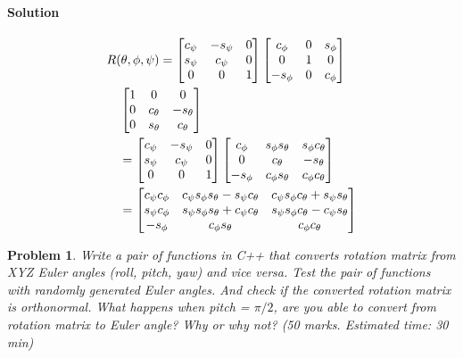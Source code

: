 \documentclass[twocolumn]{article}
\newtheorem{prob}{Problem}
\begin{document}
\paragraph*{Solution}
\begin{align}
&R(\theta, \phi, \psi) = \begin{bmatrix}
  c_\psi & - s_\psi & 0 \\
  s_\psi & c_\psi & 0 \\
  0 & 0 & 1
  \end{bmatrix}
  \begin{bmatrix}
    c_\phi & 0 & s_\phi \\
    0 & 1 & 0 \\
    - s_\phi & 0 & c_\phi
    \end{bmatrix}
 \notag\\&\quad
    \begin{bmatrix}
      1 & 0 & 0 \\
      0 & c_\theta & - s_\theta \\
      0 & s_\theta & c_\theta
      \end{bmatrix}
\notag\\&\quad
  =\begin{bmatrix}
    c_\psi & - s_\psi & 0 \\
    s_\psi & c_\psi & 0 \\
    0 & 0 & 1
  \end{bmatrix}
            \begin{bmatrix}
              c_\phi & s_\phi s_\theta & s_\phi c_\theta \\
              0 & c_\theta & -s_\theta \\
              -s_\phi & c_\phi s_\theta & c_\phi c_\theta
            \end{bmatrix}
\notag\\&\quad
  = \begin{bmatrix}
    c_\psi c_\phi & c_\psi s_\phi s_\theta - s_\psi c_\theta & c_\psi s_\phi c_\theta+ s_\psi s_\theta \\
    s_\psi c_\phi & s_\psi s_\phi s_\theta + c_\psi c_\theta & s_\psi s_\phi c_\theta - c_\psi s_\theta \\
    -s_\phi & c_\phi s_\theta & c_\phi c_\theta
    \end{bmatrix}
\end{align}
\fi

\begin{prob}
  Write a pair of functions in C++ that converts rotation matrix from XYZ Euler
angles (roll, pitch, yaw) and vice versa. Test the pair of functions with
randomly generated Euler angles. And check if the converted rotation matrix is
orthonormal. What happens when pitch = $\pi/2$, are you able to convert from
rotation matrix to Euler angle? Why or why not? (50 marks. Estimated time: 30 min)
\label{prob:euler-to-rotmat}
\end{prob}
\end{document}
